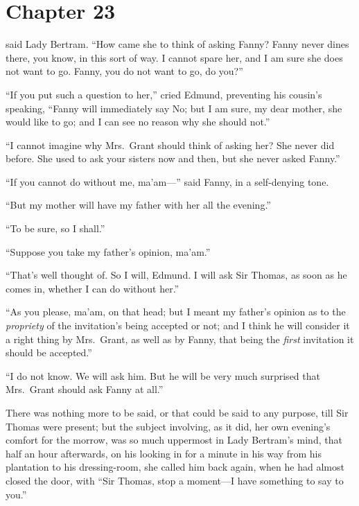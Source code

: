 \chapter{Chapter 23}

 said Lady Bertram.
``How came she to think of asking Fanny?  Fanny never
dines there, you know, in this sort of way.  I cannot
spare her, and I am sure she does not want to go.
Fanny, you do not want to go, do you?''

``If you put such a question to her,'' cried Edmund,
preventing his cousin's speaking, ``Fanny will immediately
say No; but I am sure, my dear mother, she would like to go;
and I can see no reason why she should not.''

``I cannot imagine why Mrs.\ Grant should think of asking her?
She never did before.  She used to ask your sisters now
and then, but she never asked Fanny.''

``If you cannot do without me, ma'am---'' said Fanny,
in a self-denying tone.

``But my mother will have my father with her all the evening.''

``To be sure, so I shall.''

``Suppose you take my father's opinion, ma'am.''

``That's well thought of.  So I will, Edmund.  I will
ask Sir Thomas, as soon as he comes in, whether I can
do without her.''

``As you please, ma'am, on that head; but I meant my
father's opinion as to the \emph{propriety} of the invitation's
being accepted or not; and I think he will consider
it a right thing by Mrs.\ Grant, as well as by Fanny,
that being the \emph{first} invitation it should be accepted.''

``I do not know.  We will ask him.  But he will be very
much surprised that Mrs.\ Grant should ask Fanny at all.''

There was nothing more to be said, or that could be
said to any purpose, till Sir Thomas were present;
but the subject involving, as it did, her own evening's
comfort for the morrow, was so much uppermost in Lady
Bertram's mind, that half an hour afterwards, on his
looking in for a minute in his way from his plantation
to his dressing-room, she called him back again,
when he had almost closed the door, with ``Sir Thomas,
stop a moment---I have something to say to you.''

